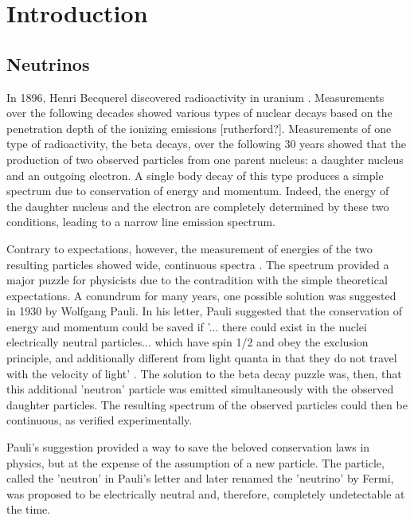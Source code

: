 \graphicspath{{chapters/introduction/images/}}
\chapter{Introduction}

\label{sec:neutrinos}
\section{Neutrinos}
In 1896, Henri Becquerel discovered radioactivity in uranium \cite{Becquerel}.
Measurements over the following decades showed various types of nuclear decays based on the penetration depth of the ionizing emissions [rutherford?].
Measurements of one type of radioactivity, the beta decays, over the following 30 years showed that the production of two observed particles from one parent nucleus: a daughter nucleus and an outgoing electron.
A single body decay of this type produces a simple spectrum due to conservation of energy and momentum.
Indeed, the energy of the daughter nucleus and the electron are completely determined by these two conditions, leading to a narrow line emission spectrum.

Contrary to expectations, however, the measurement of energies of the two resulting particles showed wide, continuous spectra \cite{Chadwick}. 
The spectrum provided a major puzzle for physicists due to the contradition with the simple theoretical expectations.
A conundrum for many years, one possible solution was suggested in 1930 by Wolfgang Pauli.
In his letter, Pauli suggested that the conservation of energy and momentum could be saved if '... there could exist in the nuclei electrically neutral particles... which have spin 1/2 and obey the exclusion principle, and additionally different from light quanta in that they do not travel with the velocity of light' \cite{Pauli-Nu}.
The solution to the beta decay puzzle was, then, that this additional 'neutron' particle was emitted simultaneously with the observed daughter particles.
The resulting spectrum of the observed particles could then be continuous, as verified experimentally.

Pauli's suggestion provided a way to save the beloved conservation laws in physics, but at the expense of the assumption of a new particle.
The particle, called the 'neutron' in Pauli's letter and later renamed the 'neutrino' by Fermi, was proposed to be electrically neutral and, therefore, completely undetectable at the time.


